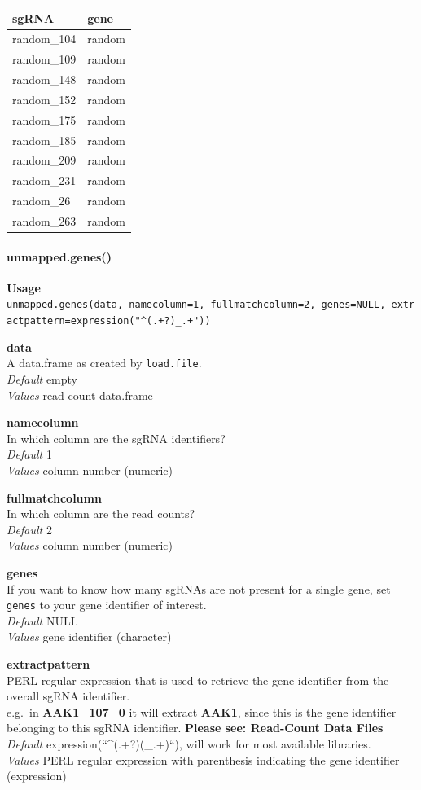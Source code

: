\documentclass[]{article}
\let\oldparagraph\paragraph
\renewcommand{\paragraph}[1]{\oldparagraph{#1}\mbox{}}
\begin{document}
\begin{longtable}[c]{@{}ll@{}}
\toprule
sgRNA & gene\tabularnewline
\midrule
\endhead
random\_104 & random\tabularnewline
random\_109 & random\tabularnewline
random\_148 & random\tabularnewline
random\_152 & random\tabularnewline
random\_175 & random\tabularnewline
random\_185 & random\tabularnewline
random\_209 & random\tabularnewline
random\_231 & random\tabularnewline
random\_26 & random\tabularnewline
random\_263 & random\tabularnewline
\bottomrule
\end{longtable}

\paragraph{unmapped.genes()}\label{unmapped.genes}

\textbf{Usage}\\
\texttt{unmapped.genes(data,\ namecolumn=1,\ fullmatchcolumn=2,\ genes=NULL,\ extractpattern=expression("\^{}(.+?)\_.+"))}

\textbf{data}\\
A data.frame as created by \texttt{load.file}.\\
\emph{Default} empty\\
\emph{Values} read-count data.frame

\textbf{namecolumn}\\
In which column are the sgRNA identifiers?\\
\emph{Default} 1\\
\emph{Values} column number (numeric)

\textbf{fullmatchcolumn}\\
In which column are the read counts?\\
\emph{Default} 2\\
\emph{Values} column number (numeric)

\textbf{genes}\\
If you want to know how many sgRNAs are not present for a single gene,
set \texttt{genes} to your gene identifier of interest.\\
\emph{Default} NULL\\
\emph{Values} gene identifier (character)

\textbf{extractpattern}\\
PERL regular expression that is used to retrieve the gene identifier
from the overall sgRNA identifier.\\
e.g.~in \textbf{AAK1\_107\_0} it will extract \textbf{AAK1}, since this
is the gene identifier belonging to this sgRNA identifier.
\textbf{Please see: Read-Count Data Files}\\
\emph{Default} expression(``\^{}(.+?)(\_.+)``), will work for most
available libraries.\\
\emph{Values} PERL regular expression with parenthesis indicating the
gene identifier (expression)
\end{document}
